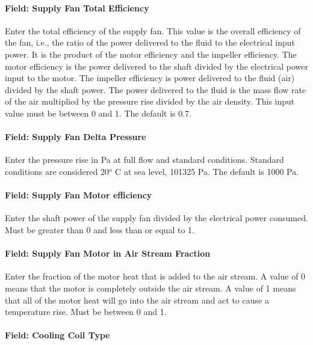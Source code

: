 \paragraph{Field: Supply Fan Total Efficiency}\label{field-supply-fan-total-efficiency-8}

Enter the total efficiency of the supply fan. This value is the overall efficiency of the fan, i.e., the ratio of the power delivered to the fluid to the electrical input power. It is the product of the motor efficiency and the impeller efficiency. The motor efficiency is the power delivered to the shaft divided by the electrical power input to the motor. The impeller efficiency is power delivered to the fluid (air) divided by the shaft power. The power delivered to the fluid is the mass flow rate of the air multiplied by the pressure rise divided by the air density. This input value must be between 0 and 1. The default is 0.7.

\paragraph{Field: Supply Fan Delta Pressure}\label{field-supply-fan-delta-pressure-7}

Enter the pressure rise in Pa at full flow and standard conditions. Standard conditions are considered 20\(^{o}\) C at sea level, 101325 Pa. The default is 1000 Pa.

\paragraph{Field: Supply Fan Motor efficiency}\label{field-supply-fan-motor-efficiency-8}

Enter the shaft power of the supply fan divided by the electrical power consumed. Must be greater than 0 and less than or equal to 1.

\paragraph{Field: Supply Fan Motor in Air Stream Fraction}\label{field-supply-fan-motor-in-air-stream-fraction-4}

Enter the fraction of the motor heat that is added to the air stream. A value of 0 means that the motor is completely outside the air stream. A value of 1 means that all of the motor heat will go into the air stream and act to cause a temperature rise. Must be between 0 and 1.

\paragraph{Field: Cooling Coil Type}\label{field-cooling-coil-type-8}

